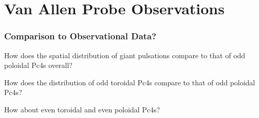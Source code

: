 \documentclass{beamer}
\begin{document}

\section{Van Allen Probe Observations}


\begin{frame}
\frametitle{Comparison to Observational Data?}

\begin{wideitemize}
\item How does the spatial distribution of giant pulsations compare to that of odd poloidal Pc4s overall?
\item How does the distribution of odd toroidal Pc4s compare to that of odd poloidal Pc4s?
\item How about even toroidal and even poloidal Pc4s?
\end{wideitemize}

\end{frame}

\end{document}
